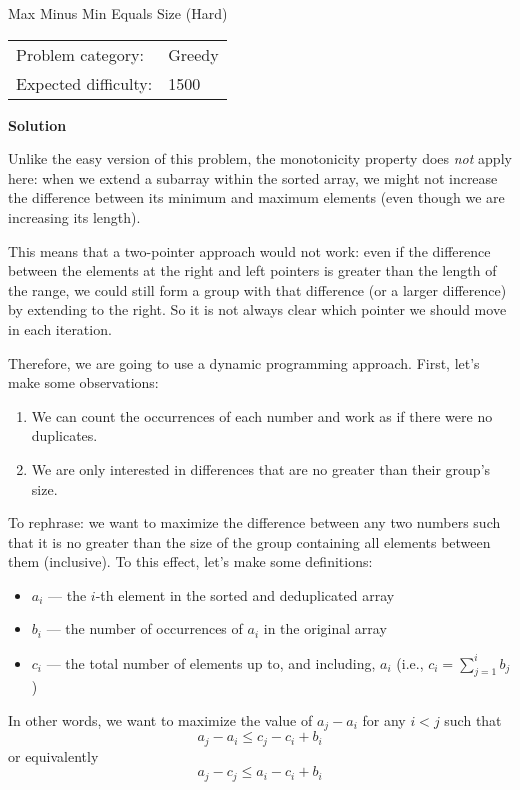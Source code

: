 \documentclass [11pt, a4paper] {article}
\begin{document}
\begin{tutorial}{Max Minus Min Equals Size (Hard)}
  
  \begin{tabular}{ll}
    Problem category:    & Greedy \\
    Expected difficulty: & 1500
  \end{tabular}
  
  \textbf{Solution}
  
  Unlike the easy version of this problem, the monotonicity property does \textit{not} apply here: when we extend a subarray within the sorted array, we might not increase the difference between its minimum and maximum elements (even though we are increasing its length).
  
  This means that a two-pointer approach would not work: even if the difference between the elements at the right and left pointers is greater than the length of the range, we could still form a group with that difference (or a larger difference) by extending to the right. So it is not always clear which pointer we should move in each iteration.
  
  Therefore, we are going to use a dynamic programming approach. First, let's make some observations:
  
  \begin{enumerate}
    \item We can count the occurrences of each number and work as if there were no duplicates.
    \item We are only interested in differences that are no greater than their group's size.
  \end{enumerate}
  
  To rephrase: we want to maximize the difference between any two numbers such that it is no greater than the size of the group containing all elements between them (inclusive). To this effect, let's make some definitions:
  
  \begin{itemize}
    \item $a_i$ --- the $i$-th element in the sorted and deduplicated array
    \item $b_i$ --- the number of occurrences of $a_i$ in the original array
    \item $c_i$ --- the total number of elements up to, and including, $a_i$ (i.e., $ c_i = \sum_{j=1}^{i} b_j $)
  \end{itemize}
  
  In other words, we want to maximize the value of $a_j - a_i$ for any $i < j$ such that $$ a_j - a_i \le c_j - c_i + b_i $$ or equivalently $$ a_j - c_j \le a_i - c_i + b_i $$
  

\end{tutorial}
\end{document}
